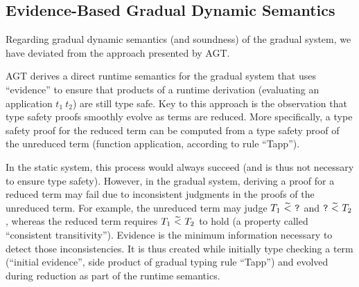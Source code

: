 \subsection{Evidence-Based Gradual Dynamic Semantics}\label{ssec:ev-based-gds}
Regarding gradual dynamic semantics (and soundness) of the gradual system, we have deviated from the approach presented by AGT.

AGT derives a direct runtime semantics for the gradual system that uses “evidence” to ensure that products of a runtime derivation (evaluating an application $t_1~t_2$) are still type safe.
Key to this approach is the observation that type safety proofs smoothly evolve as terms are reduced.
More specifically, a type safety proof for the reduced term can be computed from a type safety proof of the unreduced term (function application, according to rule “Tapp”).

In the static system, this process would always succeed (and is thus not necessary to ensure type safety).
However, in the gradual system, deriving a proof for a reduced term may fail due to inconsistent judgments in the proofs of the unreduced term.
For example, the unreduced term may judge $T_1~\widetilde{<}~\textup{\texttt{?}}$ and $\textup{\texttt{?}}~\widetilde{<}~T_2$, whereas the reduced term requires $T_1~\widetilde{<}~T_2$ to hold (a property called “consistent transitivity”).
Evidence is the minimum information necessary to detect those inconsistencies.
It is thus created while initially type checking a term (“initial evidence”, side product of gradual typing rule “\gradT Tapp”) and evolved during reduction as part of the runtime semantics.

